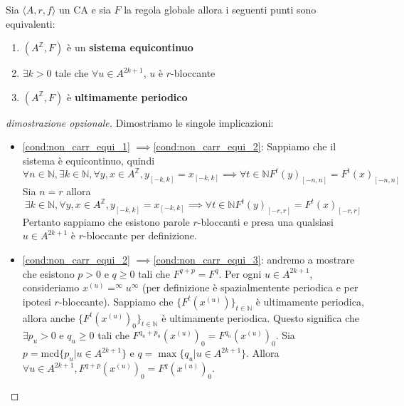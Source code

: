 \begin{teorema}
    Sia $\langle A,r,f\rangle$ un CA e sia $F$ la regola globale allora i seguenti
    punti sono equivalenti:
    \begin{enumerate}
        \item \label{cond:non_carr_equi_1} $(A^\mathbb{Z}, F)$ è un \textbf{sistema equicontinuo}
        \item \label{cond:non_carr_equi_2} $\exists k>0$ tale che $\forall u \in A^{2k+1}$, $u$ è $r$-bloccante
        \item \label{cond:non_carr_equi_3} $(A^\mathbb{Z}, F)$ è \textbf{ultimamente periodico}
    \end{enumerate}
    \begin{proof}[dimostrazione opzionale]
        Dimostriamo le singole implicazioni:
        \begin{itemize}
            \item \ref{cond:non_carr_equi_1} $\implies $\ref{cond:non_carr_equi_2}:
                  Sappiamo che il sistema è equicontinuo, quindi
                  $$\forall n\in \mathbb{N} ,\exists k\in \mathbb{N} , \forall y,x\in A^\mathbb{Z}, y_{[-k,k]} = x_{[-k,k]} \implies \forall t\in \mathbb{N} F^t(y)_{[-n,n]}=F^t(x)_{[-n,n]}$$
                  Sia $n=r$ allora
                  $$\exists k\in \mathbb{N} , \forall y,x\in A^\mathbb{Z}, y_{[-k,k]} = x_{[-k,k]} \implies \forall t\in \mathbb{N} F^t(y)_{[-r,r]}=F^t(x)_{[-r,r]}$$
                  Pertanto sappiamo che esistono parole $r$-bloccanti e presa una qualsiasi $u\in A^{2k+1}$ è $r$-bloccante per definizione.
            \item \ref{cond:non_carr_equi_2} $\implies $\ref{cond:non_carr_equi_3}:
                  andremo a mostrare che esistono $p>0$ e $q\ge 0$ tali che $F^{q+p} = F^q$.
                  Per ogni $u\in A^{2k+1}$, consideriamo $x^{(u)}=^\infty u^\infty$ (per
                  definizione è spazialmentente periodica e per ipotesi $r$-bloccante).
                  Sappiamo che $\{F^t(x^{(u)})\}_{t\in \mathbb{N}}$ è ultimamente periodica,
                  allora  anche $\{F^t(x^{(u)})_0\}_{t\in \mathbb{N}}$ è ultimamente periodica.
                  Questo significa che $\exists p_u>0$ e $q_u\ge 0$ tali che $F^{q_u+p_u}(x^{(u)})_0 =F^{q_u}(x^{(u)})_0 $.
                  Sia $p=\text{mcd}\{p_u|u\in A^{2k+1}\}$ e $q=\max\{q_u|u\in A^{2k+1}\}$.
                  Allora $\forall u\in A^{2k+1}, F^{q+p}(x^{(u)})_0 = F^{q}(x^{(u)})_0$.


\end{itemize}
\end{proof}
\end{teorema}
